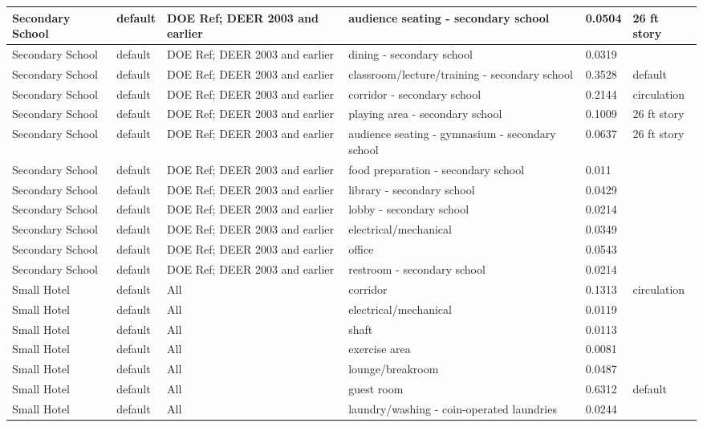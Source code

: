 \begin{center}
\begin{longtable}{|p{1.0in}|p{1.05in}|p{1.1in}|p{1.9in}|p{0.55in}|p{0.95in}|}
Secondary School & default & DOE Ref; DEER 2003 and earlier & audience seating - secondary school & 0.0504 & 26 ft story \\ \hline
Secondary School & default & DOE Ref; DEER 2003 and earlier & dining - secondary school & 0.0319 &  \\ \hline
Secondary School & default & DOE Ref; DEER 2003 and earlier & classroom/lecture/training - secondary school & 0.3528 & default \\ \hline
Secondary School & default & DOE Ref; DEER 2003 and earlier & corridor - secondary school & 0.2144 & circulation \\ \hline
Secondary School & default & DOE Ref; DEER 2003 and earlier & playing area - secondary school & 0.1009 & 26 ft story \\ \hline
Secondary School & default & DOE Ref; DEER 2003 and earlier & audience seating - gymnasium - secondary school & 0.0637 & 26 ft story \\ \hline
Secondary School & default & DOE Ref; DEER 2003 and earlier & food preparation - secondary school & 0.011 &  \\ \hline
Secondary School & default & DOE Ref; DEER 2003 and earlier & library - secondary school & 0.0429 &  \\ \hline
Secondary School & default & DOE Ref; DEER 2003 and earlier & lobby - secondary school & 0.0214 &  \\ \hline
Secondary School & default & DOE Ref; DEER 2003 and earlier & electrical/mechanical & 0.0349 &  \\ \hline
Secondary School & default & DOE Ref; DEER 2003 and earlier & office & 0.0543 &  \\ \hline
Secondary School & default & DOE Ref; DEER 2003 and earlier & restroom - secondary school & 0.0214 &  \\ \hline
Small Hotel & default & All & corridor & 0.1313 & circulation \\ \hline
Small Hotel & default & All & electrical/mechanical & 0.0119 &  \\ \hline
Small Hotel & default & All & shaft & 0.0113 &  \\ \hline
Small Hotel & default & All & exercise area & 0.0081 &  \\ \hline
Small Hotel & default & All & lounge/breakroom & 0.0487 &  \\ \hline
Small Hotel & default & All & guest room & 0.6312 & default \\ \hline
Small Hotel & default & All & laundry/washing - coin-operated laundries & 0.0244 &  \\ \hline

\end{longtable}
\end{center}
